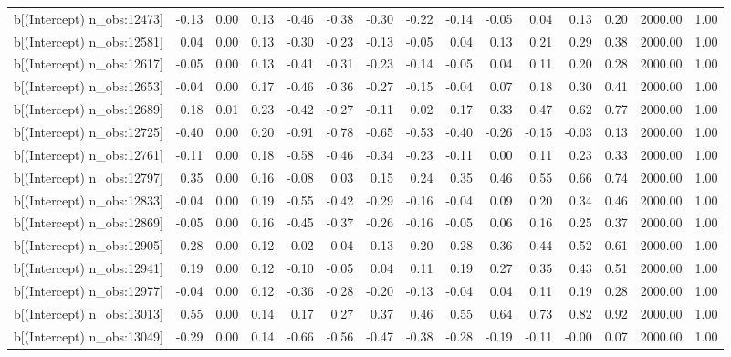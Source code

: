 \begin{table}[ht]
\begin{tabular}{rrrrrrrrrrrrrrr}
  b[(Intercept) n\_obs:12473] & -0.13 & 0.00 & 0.13 & -0.46 & -0.38 & -0.30 & -0.22 & -0.14 & -0.05 & 0.04 & 0.13 & 0.20 & 2000.00 & 1.00 \\ 
  b[(Intercept) n\_obs:12581] & 0.04 & 0.00 & 0.13 & -0.30 & -0.23 & -0.13 & -0.05 & 0.04 & 0.13 & 0.21 & 0.29 & 0.38 & 2000.00 & 1.00 \\ 
  b[(Intercept) n\_obs:12617] & -0.05 & 0.00 & 0.13 & -0.41 & -0.31 & -0.23 & -0.14 & -0.05 & 0.04 & 0.11 & 0.20 & 0.28 & 2000.00 & 1.00 \\ 
  b[(Intercept) n\_obs:12653] & -0.04 & 0.00 & 0.17 & -0.46 & -0.36 & -0.27 & -0.15 & -0.04 & 0.07 & 0.18 & 0.30 & 0.41 & 2000.00 & 1.00 \\ 
  b[(Intercept) n\_obs:12689] & 0.18 & 0.01 & 0.23 & -0.42 & -0.27 & -0.11 & 0.02 & 0.17 & 0.33 & 0.47 & 0.62 & 0.77 & 2000.00 & 1.00 \\ 
  b[(Intercept) n\_obs:12725] & -0.40 & 0.00 & 0.20 & -0.91 & -0.78 & -0.65 & -0.53 & -0.40 & -0.26 & -0.15 & -0.03 & 0.13 & 2000.00 & 1.00 \\ 
  b[(Intercept) n\_obs:12761] & -0.11 & 0.00 & 0.18 & -0.58 & -0.46 & -0.34 & -0.23 & -0.11 & 0.00 & 0.11 & 0.23 & 0.33 & 2000.00 & 1.00 \\ 
  b[(Intercept) n\_obs:12797] & 0.35 & 0.00 & 0.16 & -0.08 & 0.03 & 0.15 & 0.24 & 0.35 & 0.46 & 0.55 & 0.66 & 0.74 & 2000.00 & 1.00 \\ 
  b[(Intercept) n\_obs:12833] & -0.04 & 0.00 & 0.19 & -0.55 & -0.42 & -0.29 & -0.16 & -0.04 & 0.09 & 0.20 & 0.34 & 0.46 & 2000.00 & 1.00 \\ 
  b[(Intercept) n\_obs:12869] & -0.05 & 0.00 & 0.16 & -0.45 & -0.37 & -0.26 & -0.16 & -0.05 & 0.06 & 0.16 & 0.25 & 0.37 & 2000.00 & 1.00 \\ 
  b[(Intercept) n\_obs:12905] & 0.28 & 0.00 & 0.12 & -0.02 & 0.04 & 0.13 & 0.20 & 0.28 & 0.36 & 0.44 & 0.52 & 0.61 & 2000.00 & 1.00 \\ 
  b[(Intercept) n\_obs:12941] & 0.19 & 0.00 & 0.12 & -0.10 & -0.05 & 0.04 & 0.11 & 0.19 & 0.27 & 0.35 & 0.43 & 0.51 & 2000.00 & 1.00 \\ 
  b[(Intercept) n\_obs:12977] & -0.04 & 0.00 & 0.12 & -0.36 & -0.28 & -0.20 & -0.13 & -0.04 & 0.04 & 0.11 & 0.19 & 0.28 & 2000.00 & 1.00 \\ 
  b[(Intercept) n\_obs:13013] & 0.55 & 0.00 & 0.14 & 0.17 & 0.27 & 0.37 & 0.46 & 0.55 & 0.64 & 0.73 & 0.82 & 0.92 & 2000.00 & 1.00 \\ 
  b[(Intercept) n\_obs:13049] & -0.29 & 0.00 & 0.14 & -0.66 & -0.56 & -0.47 & -0.38 & -0.28 & -0.19 & -0.11 & -0.00 & 0.07 & 2000.00 & 1.00 \\ 

\end{tabular}
\end{table}
